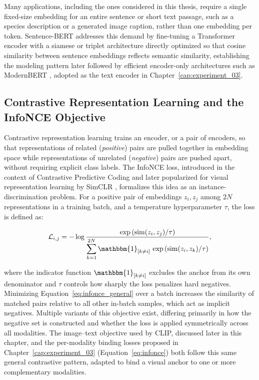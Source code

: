 Many applications, including the ones considered in this thesis, require a single fixed-size embedding for an entire sentence or short text passage, such as a species description or a generated image caption, rather than one embedding per token. Sentence-BERT \citep{reimers2019sentence} addresses this demand by fine-tuning a Transformer encoder with a siamese or triplet architecture directly optimized so that cosine similarity between sentence embeddings reflects semantic similarity, establishing the modeling pattern later followed by efficient encoder-only architectures such as ModernBERT \citep{warner2024modernbert}, adopted as the text encoder in Chapter~\ref{cap:experiment_03}.

\subsection{Contrastive Representation Learning and the InfoNCE Objective}

Contrastive representation learning trains an encoder, or a pair of encoders, so that representations of related (\emph{positive}) pairs are pulled together in embedding space while representations of unrelated (\emph{negative}) pairs are pushed apart, without requiring explicit class labels. The InfoNCE loss, introduced in the context of Contrastive Predictive Coding \citep{oord2018representation} and later popularized for visual representation learning by SimCLR \citep{chen2020simple}, formalizes this idea as an instance-discrimination problem. For a positive pair of embeddings $z_i, z_j$ among $2N$ representations in a training batch, and a temperature hyperparameter $\tau$, the loss is defined as:

\begin{equation}
\mathcal{L}_{i,j} = -\log \frac{\exp\left(\mathrm{sim}(z_i, z_j)/\tau\right)}{\displaystyle\sum_{k=1}^{2N} \mathbbm{1}_{[k \neq i]} \, \exp\left(\mathrm{sim}(z_i, z_k)/\tau\right)},
\label{eq:infonce_general}
\end{equation}

where the indicator function $\mathbbm{1}_{[k \neq i]}$ excludes the anchor from its own denominator and $\tau$ controls how sharply the loss penalizes hard negatives. Minimizing Equation~\ref{eq:infonce_general} over a batch increases the similarity of matched pairs relative to all other in-batch samples, which act as implicit negatives. Multiple variants of this objective exist, differing primarily in how the negative set is constructed and whether the loss is applied symmetrically across all modalities. The image--text objective used by CLIP, discussed later in this chapter, and the per-modality binding losses proposed in Chapter~\ref{cap:experiment_03} (Equation~\ref{eq:infonce}) both follow this same general contrastive pattern, adapted to bind a visual anchor to one or more complementary modalities.

